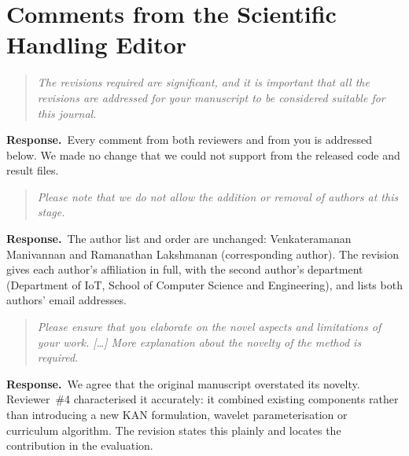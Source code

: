 \documentclass[11pt]{article}
\newenvironment{reviewer}{\begin{quote}\itshape\color{revcol}}{\end{quote}}
\newcommand{\resp}{\textbf{Response.}~}
\begin{document}
\section*{Comments from the Scientific Handling Editor}

\begin{reviewer}
The revisions required are significant, and it is important that all the revisions are addressed for your manuscript to be considered suitable for this journal.
\end{reviewer}
\resp Every comment from both reviewers and from you is addressed below. We made no change that we could not support from the released code and result files.

\begin{reviewer}
Please note that we do not allow the addition or removal of authors at this stage.
\end{reviewer}
\resp The author list and order are unchanged: Venkateramanan Manivannan and Ramanathan Lakshmanan (corresponding author). The revision gives each author's affiliation in full, with the second author's department (Department of IoT, School of Computer Science and Engineering), and lists both authors' email addresses.

\begin{reviewer}
Please ensure that you elaborate on the novel aspects and limitations of your work. [\ldots] More explanation about the novelty of the method is required.
\end{reviewer}
\resp We agree that the original manuscript overstated its novelty. Reviewer~\#4 characterised it accurately: it combined existing components rather than introducing a new KAN formulation, wavelet parameterisation or curriculum algorithm. The revision states this plainly and locates the contribution in the evaluation.
\end{document}
